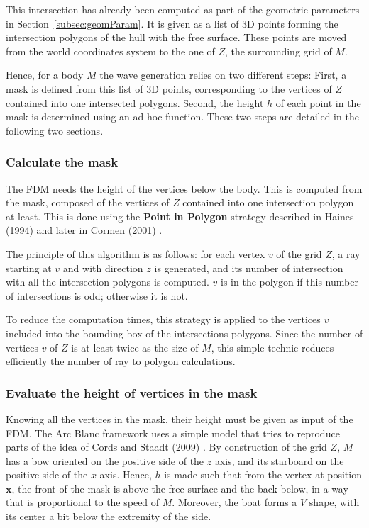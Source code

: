 \documentclass[final]{jcgt}
\def\Framework{The Arc Blanc framework\xspace}
\begin{document}
This intersection has already been computed as part of the geometric parameters in Section~\ref{subsec:geomParam}.
It is given as a list of 3D points forming the intersection polygons of the hull with the free surface.
These points are moved from the world coordinates system to the one of $Z$, the surrounding grid of $M$.

Hence, for a body $M$ the wave generation relies on two different steps:
First, a mask is defined from this list of 3D points, corresponding to the vertices of $Z$ contained into one intersected polygons.
Second, the height $h$ of each point in the mask is determined using an ad hoc function.
These two steps are detailed in the following two sections.

\subsubsection{Calculate the mask}
The FDM needs the height of the vertices below the body.
This is computed from the mask, composed of the vertices of $Z$ contained into one intersection polygon at least.
This is done using the \textbf{Point in Polygon} strategy described in Haines (1994) \cite{hainesPointPolygonStrategies1994} and later in Cormen (2001) \cite{CormenIntroductionAlgorithms2001}.

The principle of this algorithm is as follows:
for each vertex $v$ of the grid $Z$, a ray starting at $v$ and with direction $z$ is generated, and its number of intersection with all the intersection polygons is computed.
$v$ is in the polygon if this number of intersections is odd; otherwise it is not.

To reduce the computation times, this strategy is applied to the vertices $v$ included into the bounding box of the intersections polygons.
Since the number of vertices $v$ of $Z$ is at least twice as the size of $M$, this simple technic reduces efficiently the number of ray to polygon calculations.

\subsubsection{Evaluate the height of vertices in the mask}
\label{subsubsec:heightMask}
Knowing all the vertices in the mask, their height must be given as input of the FDM.
\Framework uses a simple model that tries to reproduce parts of the idea of Cords and Staadt (2009) \cite{cordsRealTimeOpenWater2009}.
By construction of the grid $Z$, $M$ has a bow oriented on the positive side of the $z$ axis, and its starboard on the positive side of the $x$ axis.
Hence, $h$ is made such that from the vertex at position $\mathbf x$, the front of the mask is above the free surface and the back below, in a way that is proportional to the speed of $M$.
Moreover, the boat forms a $V$ shape, with its center a bit below the extremity of the side.
\end{document}
